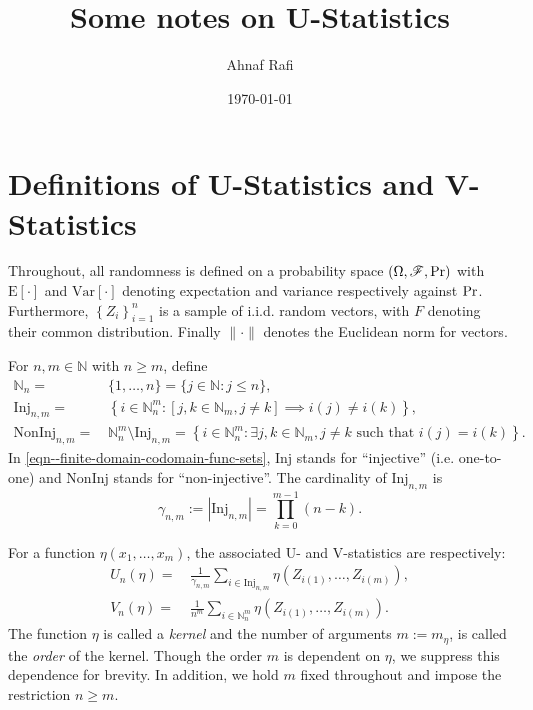 \documentclass[12pt]{article}
\title{Some notes on U-Statistics}
\author{Ahnaf Rafi}
\date{\today}
\def\Pr{\mathop{\rm Pr}\nolimits}
\numberwithin{equation}{section}
\theoremstyle{definition}
\theoremstyle{plain}
\begin{document}
\maketitle

\tableofcontents

\section{Definitions of U-Statistics and V-Statistics}

Throughout, all randomness is defined on a probability space \((\Omega,
\mathscr{F}, \Pr)\) with \(\mathrm{E} [\cdot]\) and \(\mathrm{Var} [\cdot]\)
denoting expectation and variance respectively against \(\Pr\).
Furthermore, \(\left\{ Z_{i} \right\}_{i = 1}^{n}\) is a sample of i.i.d. random
vectors, with \(F\) denoting their common distribution.
Finally \(\|\cdot\|\) denotes the Euclidean norm for vectors.

For \(n, m \in \mathbb{N}\) with \(n \geq m\), define
\begin{equation}
  \begin{split}
    \mathbb{N}_{n} =
    & \, \{1, \dots, n\} = \{j \in \mathbb{N} : j \leq n\}, \\
    \mathrm{Inj}_{n, m} =
    & \, \left\{ i \in \mathbb{N}_{n}^{m} : \left[ j, k \in
    \mathbb{N}_{m}, j \neq k \right] \implies i (j) \neq i (k)
    \right\}, \\
    \mathrm{NonInj}_{n, m} =
    & \, \mathbb{N}_{n}^{m} \setminus \mathrm{Inj}_{n, m} =
    \left\{ i \in \mathbb{N}_{n}^{m} : \exists j, k \in \mathbb{N}_{m},
    j \neq k \text{ such that } i (j) = i (k) \right\}.
  \end{split}
  \label{eqn--finite-domain-codomain-func-sets}
\end{equation}
In \eqref{eqn--finite-domain-codomain-func-sets}, \(\mathrm{Inj}\) stands for
``injective'' (i.e. one-to-one) and \(\mathrm{NonInj}\) stands for
``non-injective''.
The cardinality of \(\mathrm{Inj}_{n, m}\) is
\begin{equation}
  \gamma_{n, m} := \left| \mathrm{Inj}_{n, m} \right| = \prod_{k = 0}^{m - 1} (n
  - k).
  \label{eqn--gammanm}
\end{equation}

For a function \(\eta \left( x_{1}, \dots, x_{m} \right)\), the associated U-
and V-statistics are respectively:
\begin{equation}
  \begin{split}
    U_{n} (\eta) =
    & \, \frac{1}{\gamma_{n, m}} \sum_{i \in \mathrm{Inj}_{n, m}} \eta \left(
    Z_{i (1)}, \dots, Z_{i (m)} \right),
    \\
    V_{n} (\eta) =
    & \, \frac{1}{n^{m}} \sum_{i \in \mathbb{N}_{n}^{m}} \eta \left( Z_{i (1)},
    \dots, Z_{i (m)} \right).
  \end{split}
  \label{eqn--U-V-stat}
\end{equation}
The function \(\eta\) is called a \emph{kernel} and the number of arguments
\(m := m_{\eta}\), is called the \emph{order} of the kernel.
Though the order \(m\) is dependent on \(\eta\), we suppress this dependence for
brevity.
In addition, we hold \(m\) fixed throughout and impose the restriction \(n \geq
m\).
\end{document}
